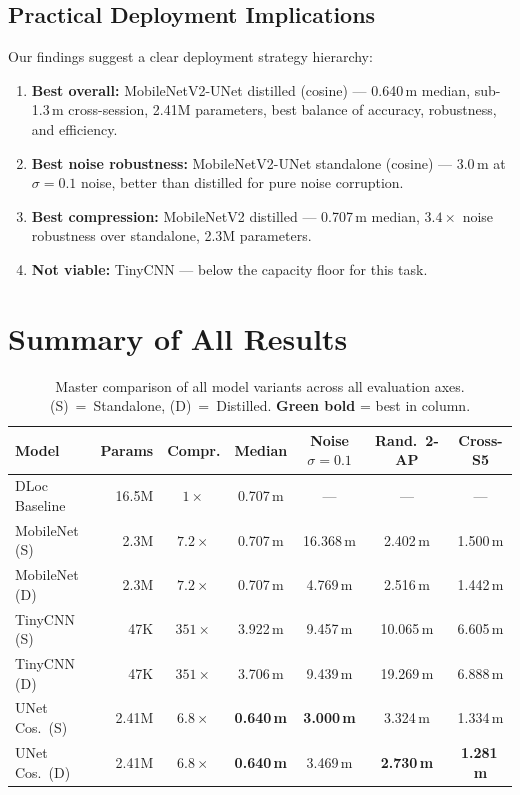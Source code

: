 \documentclass[11pt,a4paper]{article}
\newcommand{\best}[1]{\textcolor{bestcolor}{\textbf{#1}}}
\newcommand{\worst}[1]{\textcolor{worstcolor}{#1}}
\begin{document}
\subsection{Practical Deployment Implications}

Our findings suggest a clear deployment strategy hierarchy:

\begin{enumerate}[nosep]
  \item \textbf{Best overall:} MobileNetV2-UNet distilled (cosine) --- 0.640\,m median, sub-1.3\,m cross-session, 2.41M parameters, best balance of accuracy, robustness, and efficiency.
  \item \textbf{Best noise robustness:} MobileNetV2-UNet standalone (cosine) --- 3.0\,m at $\sigma = 0.1$ noise, better than distilled for pure noise corruption.
  \item \textbf{Best compression:} MobileNetV2 distilled --- 0.707\,m median, $3.4\times$ noise robustness over standalone, 2.3M parameters.
  \item \textbf{Not viable:} TinyCNN --- below the capacity floor for this task.
\end{enumerate}


\section{Summary of All Results}
\label{sec:summary_table}

\begin{table}[H]
\centering
\caption{Master comparison of all model variants across all evaluation axes. (S)~=~Standalone, (D)~=~Distilled. \best{Green bold} = best in column.}
\label{tab:master}
\begin{tabular}{@{}lrccccc@{}}
\toprule
\textbf{Model} & \textbf{Params} & \textbf{Compr.} & \textbf{Median} & \textbf{Noise $\sigma\!=\!0.1$} & \textbf{Rand.\ 2-AP} & \textbf{Cross-S5} \\
\midrule
DLoc Baseline     & 16.5M  & $1\times$   & 0.707\,m  & ---       & ---       & --- \\
MobileNet (S)     & 2.3M   & $7.2\times$ & 0.707\,m  & \worst{16.368\,m} & 2.402\,m  & 1.500\,m \\
MobileNet (D)     & 2.3M   & $7.2\times$ & 0.707\,m  & 4.769\,m  & 2.516\,m  & 1.442\,m \\
TinyCNN (S)       & 47K    & $351\times$ & 3.922\,m  & 9.457\,m  & 10.065\,m & 6.605\,m \\
TinyCNN (D)       & 47K    & $351\times$ & 3.706\,m  & 9.439\,m  & 19.269\,m & 6.888\,m \\
UNet Cos.\ (S)    & 2.41M  & $6.8\times$ & \best{0.640\,m} & \best{3.000\,m} & 3.324\,m  & 1.334\,m \\
UNet Cos.\ (D)    & 2.41M  & $6.8\times$ & \best{0.640\,m} & 3.469\,m  & \best{2.730\,m} & \best{1.281\,m} \\
\bottomrule
\end{tabular}
\end{table}
\end{document}
